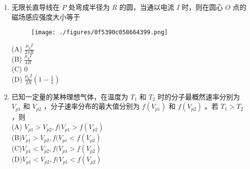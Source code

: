 \begin{enumerate}
\begin{figure}[ht]
\centering
\texttt{[image: ./figures/be70e5d8ab907a9b.png]}
\caption{} \label{fig_BKDP06_11}
\end{figure}
(A) $\displaystyle E=\frac{Q}{4\pi\varepsilon_0 r^2},U=\frac{Q}{4\pi\varepsilon_0 r}$\\
(B) $\displaystyle E=\frac{Q}{4\pi\varepsilon_0 r^2},U=\frac{Q}{4\pi\varepsilon_0} (\frac{1}{R_1}-\frac{1}{r})$\\
(C) $\displaystyle E=\frac{Q}{4\pi\varepsilon_0 r^2},U=\frac{Q}{4\pi\varepsilon_0} (\frac{1}{r}-\frac{1}{R_2}) $\\
(D)$\displaystyle E=0,\qquad U=\frac{Q}{4 \pi \varepsilon_0 R_2}$
\item 无限长直导线在 $P$ 处弯成半径为 $R$ 的圆，当通以电流 $I$ 时，则在圆心  $O$ 点的磁场感应强度大小等于\\
\begin{figure}[ht]
\centering
\texttt{[image: ./figures/0f5390c058664399.png]}
\caption{} \label{fig_BKDP06_14}
\end{figure}
(A) $\displaystyle \frac{\mu_0 I}{2 \pi R}$\\
(B) $\displaystyle \frac{\mu_0 I}{4R}$\\
(C) $0$\\
(D) $\displaystyle \frac{\mu_0 I}{2R}(1-\frac{1}{\pi})$
\item 已知一定量的某种理想气体，在温度为 $T_1$ 和 $T_2$ 时的分子最概然速率分别为 $V_{p1}$ 和 $V_{p2}$ ，分子速率分布的最大值分别为 $f(V_{p1})$ 和 $f(V_{p2})$ 。若 $T_1>T_2$ ，则\\
(A) $V_{p1}>V_{p2},f(V_{p1}>f(V_{p2})$\\
(B)$V_{p1}>V_{p2},f(V_{p1}<f(V_{p2})$\\
(C)$V_{p1}<V_{p2},f(V_{p1}>f(V_{p2})$\\
(D)$V_{p1}<V_{p2},f(V_{p1}<f(V_{p2})$\\

\end{enumerate}
